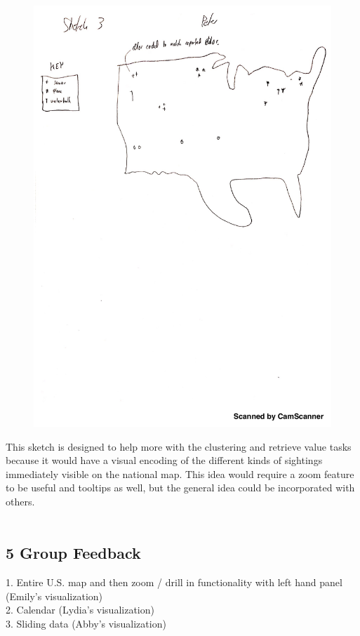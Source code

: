 \documentclass{neu_handout}
\begin{document}
\begin{figure}[h]
\centering
{
\includegraphics[width=0.7\linewidth]{peter3}
}
\end{figure}
This sketch is designed to help more with the clustering and retrieve value tasks because it would have a visual encoding of the different kinds of sightings immediately visible on the national map. This idea would require a zoom feature to be useful and tooltips as well, but the general idea could be incorporated with others.\\\\

\newpage

\subsection*{5 Group Feedback}

1. Entire U.S. map and then zoom / drill in functionality with left hand panel (Emily's visualization) \\

2. Calendar (Lydia's visualization) \\

3. Sliding data (Abby's visualization)
\end{document}
